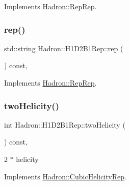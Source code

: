 Implements \mbox{\hyperlink{structHadron_1_1RepRep_ab3213025f6de249f7095892109575fde}{Hadron\+::\+Rep\+Rep}}.

\mbox{\label{structHadron_1_1H1D2B1Rep_a4728e19334216fe0a85733f3356d8716}} 
\subsubsection{\texorpdfstring{rep()}{rep()}\hspace{0.1cm}{\footnotesize\ttfamily [5/5]}}
{\footnotesize\ttfamily std\+::string Hadron\+::\+H1\+D2\+B1\+Rep\+::rep (\begin{DoxyParamCaption}{ }\end{DoxyParamCaption}) const\hspace{0.3cm}{\ttfamily [inline]}, {\ttfamily [virtual]}}



Implements \mbox{\hyperlink{structHadron_1_1RepRep_ab3213025f6de249f7095892109575fde}{Hadron\+::\+Rep\+Rep}}.

\mbox{\label{structHadron_1_1H1D2B1Rep_a3cc2db9e517e6a40e7205a5dbc9b32c9}} 
\subsubsection{\texorpdfstring{twoHelicity()}{twoHelicity()}\hspace{0.1cm}{\footnotesize\ttfamily [1/3]}}
{\footnotesize\ttfamily int Hadron\+::\+H1\+D2\+B1\+Rep\+::two\+Helicity (\begin{DoxyParamCaption}{ }\end{DoxyParamCaption}) const\hspace{0.3cm}{\ttfamily [inline]}, {\ttfamily [virtual]}}

2 $\ast$ helicity 

Implements \mbox{\hyperlink{structHadron_1_1CubicHelicityRep_af507aa56fc2747eacc8cb6c96db31ecc}{Hadron\+::\+Cubic\+Helicity\+Rep}}.

\mbox{\label{structHadron_1_1H1D2B1Rep_a3cc2db9e517e6a40e7205a5dbc9b32c9}} 
